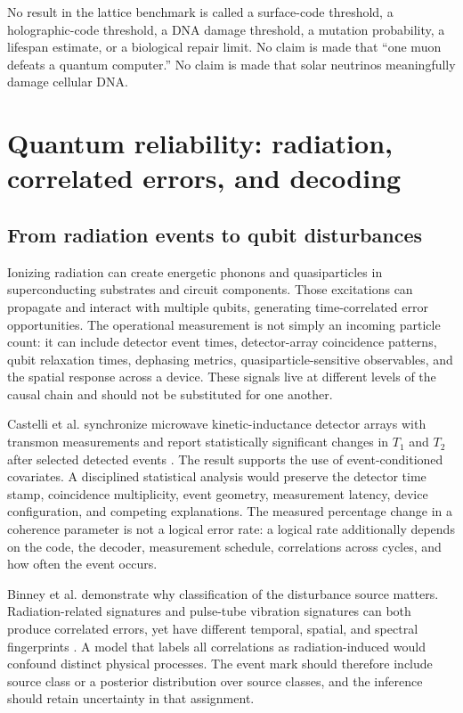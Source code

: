 \documentclass[11pt,a4paper,oneside]{article}
\newenvironment{scopebox}{\begin{tcolorbox}[colback=coral!6,colframe=coral!75!black,boxrule=.8pt,arc=2mm,title=Scope boundary]}{\end{tcolorbox}}
\begin{document}
\begin{scopebox}
No result in the lattice benchmark is called a surface-code threshold, a holographic-code threshold, a DNA damage threshold, a mutation probability, a lifespan estimate, or a biological repair limit. No claim is made that ``one muon defeats a quantum computer.'' No claim is made that solar neutrinos meaningfully damage cellular DNA.
\end{scopebox}

\section{Quantum reliability: radiation, correlated errors, and decoding}
\label{sec:quantum}
\subsection{From radiation events to qubit disturbances}
Ionizing radiation can create energetic phonons and quasiparticles in superconducting substrates and circuit components. Those excitations can propagate and interact with multiple qubits, generating time-correlated error opportunities. The operational measurement is not simply an incoming particle count: it can include detector event times, detector-array coincidence patterns, qubit relaxation times, dephasing metrics, quasiparticle-sensitive observables, and the spatial response across a device. These signals live at different levels of the causal chain and should not be substituted for one another.

Castelli et al. synchronize microwave kinetic-inductance detector arrays with transmon measurements and report statistically significant changes in \(T_1\) and \(T_2\) after selected detected events \citep{Castelli2026}. The result supports the use of event-conditioned covariates. A disciplined statistical analysis would preserve the detector time stamp, coincidence multiplicity, event geometry, measurement latency, device configuration, and competing explanations. The measured percentage change in a coherence parameter is not a logical error rate: a logical rate additionally depends on the code, the decoder, measurement schedule, correlations across cycles, and how often the event occurs.

Binney et al. demonstrate why classification of the disturbance source matters. Radiation-related signatures and pulse-tube vibration signatures can both produce correlated errors, yet have different temporal, spatial, and spectral fingerprints \citep{Binney2026}. A model that labels all correlations as radiation-induced would confound distinct physical processes. The event mark should therefore include source class or a posterior distribution over source classes, and the inference should retain uncertainty in that assignment.
\end{document}
